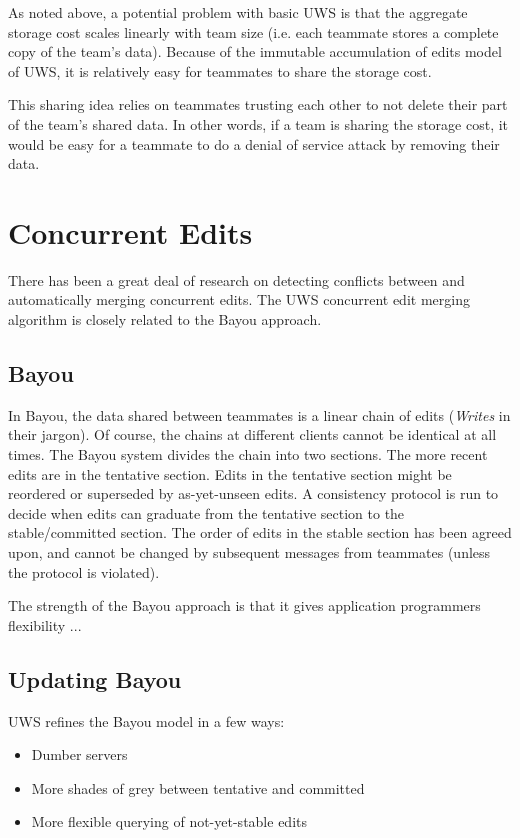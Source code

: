 \documentclass{article}
\begin{document}
As noted above, a potential problem with basic UWS is that the aggregate storage cost scales linearly with team size (i.e. each teammate stores a complete copy of the team's data).
Because of the immutable accumulation of edits model of UWS, it is relatively easy for teammates to share the storage cost.

This sharing idea relies on teammates trusting each other to not delete their part of the team's shared data.
In other words, if a team is sharing the storage cost, it would be easy for a teammate to do a denial of service attack by removing their data.

\section{Concurrent Edits}

There has been a great deal of research on detecting conflicts between and automatically merging concurrent edits.
The UWS concurrent edit merging algorithm is closely related to the Bayou approach.

\subsection{Bayou}

In Bayou, the data shared between teammates is a linear chain of edits (\emph{Writes} in their jargon).
Of course, the chains at different clients cannot be identical at all times.
The Bayou system divides the chain into two sections.
The more recent edits are in the tentative section.
Edits in the tentative section might be reordered or superseded by as-yet-unseen edits.
A consistency protocol is run to decide when edits can graduate from the tentative section to the stable/committed section.
The order of edits in the stable section has been agreed upon, and cannot be changed by subsequent messages from teammates (unless the protocol is violated).

The strength of the Bayou approach is that it gives application programmers flexibility ...

\subsection{Updating Bayou}

UWS refines the Bayou model in a few ways:

\begin{itemize}
\item Dumber servers
\item More shades of grey between tentative and committed
\item More flexible querying of not-yet-stable edits
\end{itemize}
\end{document}

